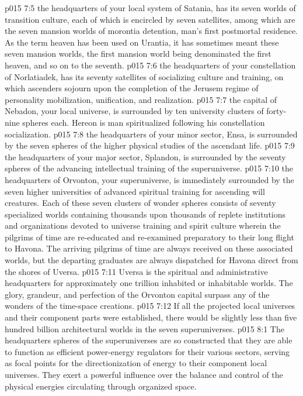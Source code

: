 \vs p015 7:5 \pc {} the headquarters of your local system of Satania, has its seven worlds of transition culture, each of which is encircled by seven satellites, among which are the seven mansion worlds of morontia detention, man’s first postmortal residence. As the term heaven has been used on Urantia, it has sometimes meant these seven mansion worlds, the first mansion world being denominated the first heaven, and so on to the seventh.
\vs p015 7:6 \pc {} the headquarters of your constellation of Norlatiadek, has its seventy satellites of socializing culture and training, on which ascenders sojourn upon the completion of the Jerusem regime of personality mobilization, unification, and realization.
\vs p015 7:7 \pc {} the capital of Nebadon, your local universe, is surrounded by ten university clusters of forty\hyp{}nine spheres each. Hereon is man spiritualized following his constellation socialization.
\vs p015 7:8 \pc {} the headquarters of your minor sector, Ensa, is surrounded by the seven spheres of the higher physical studies of the ascendant life.
\vs p015 7:9 \pc {} the headquarters of your major sector, Splandon, is surrounded by the seventy spheres of the advancing intellectual training of the superuniverse.
\vs p015 7:10 \pc {} the headquarters of Orvonton, your superuniverse, is immediately surrounded by the seven higher universities of advanced spiritual training for ascending will creatures. Each of these seven clusters of wonder spheres consists of seventy specialized worlds containing thousands upon thousands of replete institutions and organizations devoted to universe training and spirit culture wherein the pilgrims of time are re\hyp{}educated and re\hyp{}examined preparatory to their long flight to Havona. The arriving pilgrims of time are always received on these associated worlds, but the departing graduates are always dispatched for Havona direct from the shores of Uversa.
\vs p015 7:11 Uversa is the spiritual and administrative headquarters for approximately one trillion inhabited or inhabitable worlds. The glory, grandeur, and perfection of the Orvonton capital surpass any of the wonders of the time\hyp{}space creations.
\vs p015 7:12 \pc If all the projected local universes and their component parts were established, there would be slightly less than five hundred billion architectural worlds in the seven superuniverses.
\vs p015 8:1 The headquarters spheres of the superuniverses are so constructed that they are able to function as efficient power\hyp{}energy regulators for their various sectors, serving as focal points for the directionization of energy to their component local universes. They exert a powerful influence over the balance and control of the physical energies circulating through organized space.
